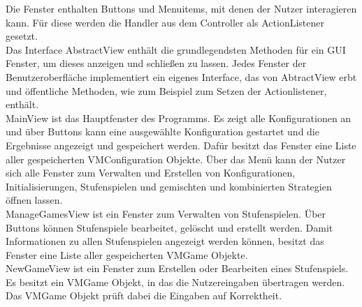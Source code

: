 Die Fenster enthalten Buttons und Menuitems, mit denen der Nutzer interagieren kann. Für diese werden die Handler aus dem Controller als ActionListener gesetzt.\\ 

Das Interface AbstractView enthält die grundlegendsten Methoden für ein GUI Fenster, um dieses anzeigen und schließen zu lassen. Jedes Fenster der Benutzeroberfläche implementiert ein eigenes Interface, das von AbtractView erbt und öffentliche Methoden, wie zum Beispiel zum Setzen der Actionlistener, enthält.\\

MainView ist das Hauptfenster des Programms. Es zeigt alle Konfigurationen an und über Buttons kann eine ausgewählte Konfiguration gestartet und die Ergebnisse angezeigt und gespeichert werden. Dafür besitzt das Fenster eine Liste aller gespeicherten VMConfiguration Objekte.
Über das Menü kann der Nutzer sich alle Fenster zum Verwalten und Erstellen von Konfigurationen, Initialisierungen, Stufenspielen und gemischten und kombinierten Strategien öffnen lassen.\\

ManageGamesView ist ein Fenster zum Verwalten von Stufenspielen. Über Buttons können Stufenspiele bearbeitet, gelöscht und erstellt werden. Damit Informationen zu allen Stufenspielen angezeigt werden können, besitzt das Fenster eine Liste aller gespeicherten VMGame Objekte. \\

NewGameView ist ein Fenster zum Erstellen oder Bearbeiten eines Stufenspiels. Es besitzt ein VMGame Objekt, in das die Nutzereingaben übertragen werden. Das VMGame Objekt prüft dabei die Eingaben auf Korrektheit. \\

